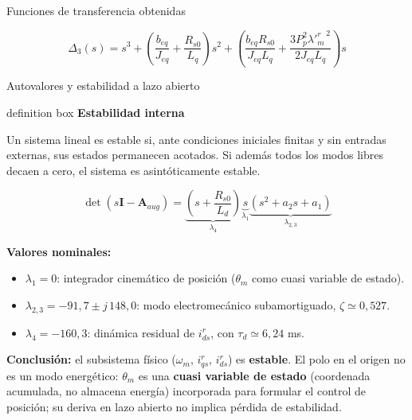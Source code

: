 \documentclass[aspectratio=169,t]{beamer}
\newcommand{\definitionbox}[2]{%
  \begin{beamercolorbox}[wd=\linewidth,sep=0.9ex,leftskip=0.9ex,rightskip=0.9ex]{definition box}%
    {\small\bfseries\color{uncBlue}#1}\par\vspace{0.2mm}%
    {\small #2}%
  \end{beamercolorbox}%
}
\begin{document}
\begin{frame}{Funciones de transferencia obtenidas}
\vspace{2mm}

\small
\begin{equation*}
\Delta_3(s)=
s^3+
\left(\frac{b_{eq}}{J_{eq}}+\frac{R_{s0}}{L_q}\right)s^2+
\left(\frac{b_{eq}R_{s0}}{J_{eq}L_q}+
\frac{3P_p^2{\lambda'^r_m}^{\,2}}{2J_{eq}L_q}\right)s
\end{equation*}

\vspace{2mm}
\normalsize


\end{frame}



\begin{frame}{Autovalores y estabilidad a lazo abierto}
\vspace{1mm}

\definitionbox{Estabilidad interna}{Un sistema lineal es estable si, ante condiciones iniciales finitas y sin entradas externas, sus estados permanecen acotados. Si además todos los modos libres decaen a cero, el sistema es asintóticamente estable.}
\vspace{1mm}

{\small
\begin{equation*}
\det(s\bm{I}-\bm{A}_{aug})=
\underbrace{\left(s+\frac{R_{s0}}{L_d}\right)}_{\lambda_4}
\underbrace{s}_{\lambda_1}
\underbrace{\left(s^2+a_2s+a_1\right)}_{\lambda_{2,3}}
\end{equation*}
}

\footnotesize
\textbf{Valores nominales:}
\begin{itemize}\setlength{\itemsep}{0pt}
  \item $\lambda_1=0$: integrador cinemático de posición ($\theta_m$ como cuasi variable de estado).
  \item $\lambda_{2,3}=-91{,}7\pm j\,148{,}0$: modo electromecánico subamortiguado, $\zeta\simeq0{,}527$.
  \item $\lambda_4=-160{,}3$: dinámica residual de $i_{ds}^{r}$, con $\tau_d\simeq6{,}24$ ms.
\end{itemize}

\textbf{Conclusión:} el subsistema físico ($\omega_m$, $i_{qs}^r$, $i_{ds}^{r}$) es \textbf{estable}. El polo en el origen no es un modo energético: $\theta_m$ es una \textbf{cuasi variable de estado} (coordenada acumulada, no almacena energía) incorporada para formular el control de posición; su deriva en lazo abierto no implica pérdida de estabilidad.
\end{frame}
\end{document}
